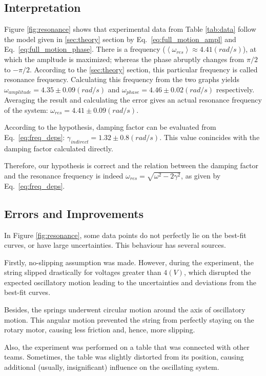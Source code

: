 \subsection{Interpretation}
Figure \ref{fig:resonance} shows that experimental data from Table \ref{tab:data} follow the model given in \ref{sec:theory} section by Eq.~\eqref{eq:full_motion_ampl} and Eq.~\eqref{eq:full_motion_phase}. There is a frequency ($\left< \omega_{res} \right> \approx 4.41 (rad/s)$), at which the ampltude is maximized; whereas the phase abruptly changes from $\pi/2$ to $-\pi/2$. According to the \ref{sec:theory} section, this particular frequency is called resonance frequency. Calculating this frequency from the two graphs yields $\omega_{amplitude} = 4.35 \pm 0.09 (rad/s)$ and $\omega_{phase} = 4.46 \pm 0.02 (rad/s)$ respectively. Averaging the result and calculating the error gives an actual resonance frequency of the system: $\omega_{res} = 4.41 \pm 0.09 (rad/s)$.

According to the hypothesis, damping factor can be evaluated from Eq.~\eqref{eq:freq_deps}: $\gamma_{indirect} = 1.32 \pm 0.8 (rad/s)$. This value conincides with the damping factor calculated directly.

Therefore, our hypothesis is correct and the relation between the damping factor and the resonance frequency is indeed $\omega_{res} = \sqrt{\omega^2 - 2\gamma^2}$, as given by Eq.~\eqref{eq:freq_deps}.

\subsection{Errors and Improvements}

In Figure \ref{fig:resonance}, some data points do not perfectly lie on the best-fit curves, or have large uncertainties. This behaviour has several sources.

Firstly, no-slipping assumption was made. However, during the experiment, the string slipped drastically for voltages greater than $4 (V)$, which disrupted the expected oscillatory motion leading to the uncertainties and deviations from the best-fit curves.

Besides, the springs underwent circular motion around the axis of oscillatory motion. This angular motion prevented the string from perfectly staying on the rotary motor, causing less friction and, hence, more slipping.

Also, the experiment was performed on a table that was connected with other teams. Sometimes, the table was slightly distorted from its position, causing additional (usually, insignificant) influence on the oscillating system.


